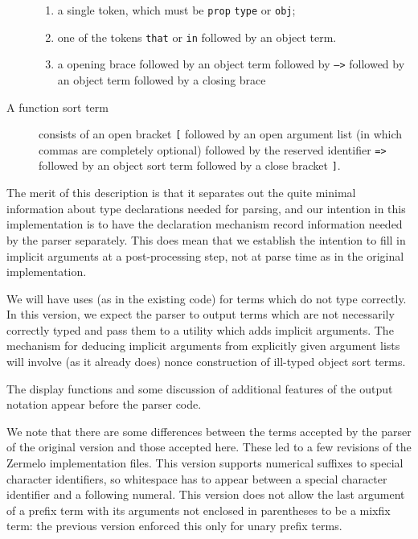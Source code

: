 \documentclass[12pt]{article}
\begin{document}
\begin{description}
\begin{enumerate}

\item a single token, which must be {\tt prop}  {\tt type} or {\tt obj};

\item  one of the tokens {\tt that} or {\tt in} followed by an object term.

\item a opening brace followed by an object term followed by {\tt -->} followed by an object term followed by a closing brace

\end{enumerate}

\item [A function sort term] consists of an open bracket \verb|[| followed by an open argument list (in which commas are completely optional) followed by the reserved identifier {\tt =>} followed by an object  sort term followed by
a close bracket \verb|]|.

\end{description}

The merit of this description is that it separates out the quite minimal information about type declarations needed for parsing, and our intention in this implementation is to have the declaration mechanism record information needed by the  parser separately.  This does mean that we establish the intention to fill in implicit arguments at a post-processing step, not at parse time as in the original implementation.

We will have uses (as in the existing code) for terms which do not type correctly.  In this version, we expect the parser to output terms which are not necessarily correctly typed
and pass them to a utility which adds implicit arguments.  The mechanism for deducing implicit arguments from explicitly given argument lists will involve (as it already does)
nonce construction of ill-typed object sort terms.

The display functions and some discussion of additional features of the output notation appear before the parser code.

We note that there are some differences between the terms accepted by the parser of the original version and those accepted here.  These led to a few revisions of the Zermelo implementation files.  This version supports numerical suffixes to special character identifiers, so whitespace has to appear between a special character identifier and a following numeral.  This version does not allow the last argument of a prefix term with its arguments not enclosed in parentheses to be a mixfix term:  the previous version enforced this only for unary prefix terms.
\end{document}
